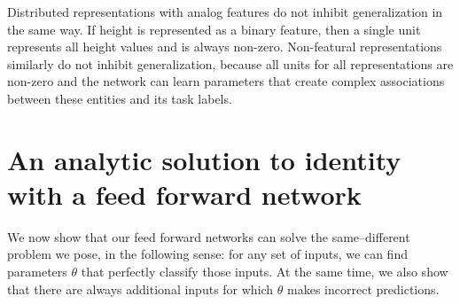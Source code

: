 Distributed representations with analog features do not inhibit generalization in the same way. If height is represented as a binary feature, then a single unit represents all height values and is always non-zero. Non-featural representations similarly do not inhibit generalization, because all units for all representations are non-zero and the network can learn parameters that create complex associations between these entities and its task labels.


\section{An analytic solution to identity with a feed forward network}\label{app:equality-solution}

We now show that our feed forward networks can solve the same--different problem we pose, in the following sense: for any set of inputs, we can find parameters $\theta$ that perfectly classify those inputs. At the same time, we also show that there are always additional inputs for which $\theta$ makes incorrect predictions.

